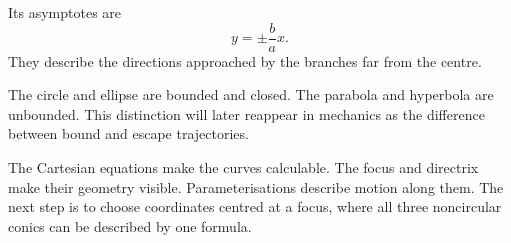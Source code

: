 Its asymptotes are
\[
\boxed{y=\pm\frac ba x}.
\]
They describe the directions approached by the branches far from the centre.

\begin{interpretationbox}
The circle and ellipse are bounded and closed. The parabola and hyperbola are
unbounded. This distinction will later reappear in mechanics as the difference
between bound and escape trajectories.
\end{interpretationbox}

\begin{summarybox}
The Cartesian equations make the curves calculable. The focus and directrix
make their geometry visible. Parameterisations describe motion along them. The
next step is to choose coordinates centred at a focus, where all three
noncircular conics can be described by one formula.
\end{summarybox}